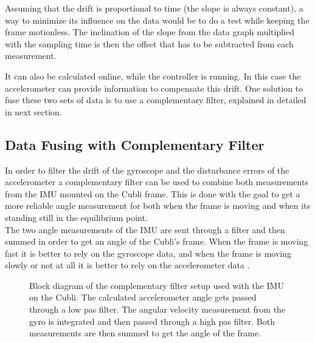 Assuming that the drift is proportional to time (the slope is always constant), a way to minimize its influence on the data would be to do a test while keeping the frame motionless. The inclination of the slope from the data graph multiplied with the sampling time is then the offset that has to be subtracted from each measurement.

It can also be calculated online, while the controller is running. In this case the accelerometer can provide information to compensate this drift. One solution to fuse these two sets of data is to use a complementary filter, explained in detailed in next section.

\subsection{Data Fusing with Complementary Filter}
In order to filter the drift of the gyroscope and the disturbance errors of the accelerometer a complementary filter can be used to combine both measurements from the IMU mounted on the Cubli frame. This is done with the goal to get a more reliable angle measurement for both when the frame is moving and when its standing still in the equilibrium point.\\
The two angle measurements of the IMU are sent through a filter and then summed in order to get an angle of the Cubli's frame. When the frame is moving fast it is better to rely on the gyroscope data, and when the frame is moving slowly or not at all it is better to rely on the accelerometer data \cite{PGui}.

\begin{figure}[H]
	
	\centering
	\caption{Block diagram of the complementary filter setup used with the IMU on the Cubli. The calculated accelerometer angle gets passed through a low pas filter. The angular velocity measurement from the gyro is integrated and then passed through a high pas filter. Both measurements are then summed to get the angle of the frame.}
	\label{blockDrawingComplementaryFilter}
\end{figure}

